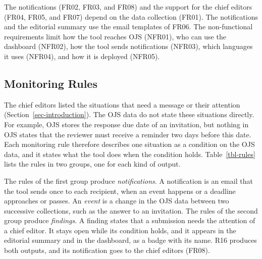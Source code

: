 \documentclass[12pt]{article}
\begin{document}
The notifications (FR02, FR03, and FR08) and the support for the chief
editors (FR04, FR05, and FR07) depend on the data collection (FR01). The
notifications and the editorial summary use the email templates of FR06. The
non-functional
requirements limit how the tool reaches OJS (NFR01), who can use the
dashboard (NFR02), how the tool sends notifications (NFR03), which languages
it uses (NFR04), and how it is deployed (NFR05).

\subsection{Monitoring Rules}
\label{sec-rules}

The chief editors listed the situations that need a message or their
attention (Section~\ref{sec-introduction}). The OJS data do not state these
situations directly. For example, OJS stores the response due date of an
invitation, but nothing in OJS states that the reviewer must receive a
reminder two days before this date. Each monitoring rule therefore describes
one situation as a condition on the OJS data, and it states what the tool
does when the condition holds. Table~\ref{tbl-rules} lists the rules in two
groups, one for each kind of output.

The rules of the first group produce \emph{notifications}. A notification is
an email that the tool sends once to each recipient, when an event happens or
a deadline approaches or passes. An \emph{event} is a change in the OJS data
between two successive collections, such as the answer to an invitation. The rules of
the second group produce \emph{findings}. A finding states that a submission
needs the attention of a chief editor. It stays open while its condition
holds, and it appears in the editorial summary and in the dashboard, as a
badge with its name. R16 produces both outputs, and its notification goes to
the chief editors (FR08).
\end{document}
